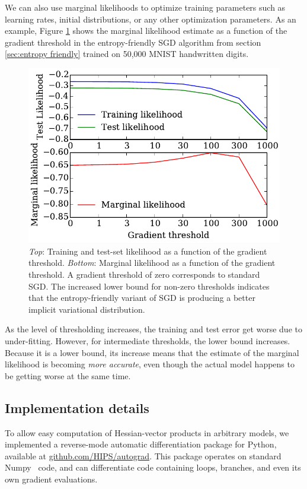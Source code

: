 \documentclass[]{article}
\begin{document}
We can also use marginal likelihoods to optimize training parameters such as learning rates, initial distributions, or any other optimization parameters.
As an example, Figure \ref{fig:threshold} shows the marginal likelihood estimate as a function of the gradient threshold in the entropy-friendly SGD algorithm from section \ref{sec:entropy friendly} trained on 50,000 MNIST handwritten digits.

\begin{figure}[h!]
\begin{center}
\includegraphics[width=\columnwidth]{../experiments/2015_03_03_vary_width/5_grad_threshold/vary_widths.pdf}
\vskip -0.1in
\caption{\emph{Top}: Training and test-set likelihood as a function of the gradient threshold.
\emph{Bottom}: Marginal likelihood as a function of the gradient threshold.
A gradient threshold of zero corresponds to standard SGD.
The increased lower bound for non-zero thresholds indicates that the entropy-friendly variant of SGD is producing a better implicit variational distribution.}
\label{fig:threshold}
\end{center}
\end{figure}

As the level of thresholding increases, the training and test error get worse due to under-fitting.
However, for intermediate thresholds, the lower bound increases.
Because it is a lower bound, its increase means that the estimate of the marginal likelihood is becoming \emph{more accurate}, even though the actual model happens to be getting worse at the same time.

\subsection{Implementation details}
To allow easy computation of Hessian-vector products in arbitrary models, we implemented
a reverse-mode automatic differentiation package for Python, available at \url{github.com/HIPS/autograd}.
This package operates on standard Numpy~\citep{oliphant2007python} code, and can differentiate code containing loops, branches, and even its own gradient evaluations.
\end{document}
